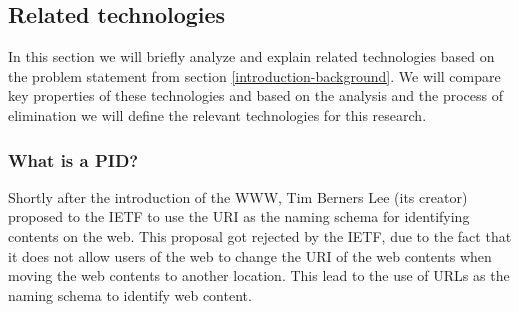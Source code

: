 


\subsection{Related technologies}
In this section we will briefly analyze and explain related technologies based on the problem statement from section \ref{introduction-background}. We will compare key properties of these technologies and based on the analysis and the process of elimination we will define the relevant technologies for this research.

\subsubsection{What is a PID?}\label{pid-intr}
Shortly after the introduction of the WWW, Tim Berners Lee (its creator) proposed to the IETF to use the URI as the naming schema for identifying contents on the web. This proposal got rejected by the IETF, due to the fact that it does not allow users of the web to change the URI of the web contents when moving the web contents to another location. This lead to the use of URLs as the naming schema to identify web content. 
 
